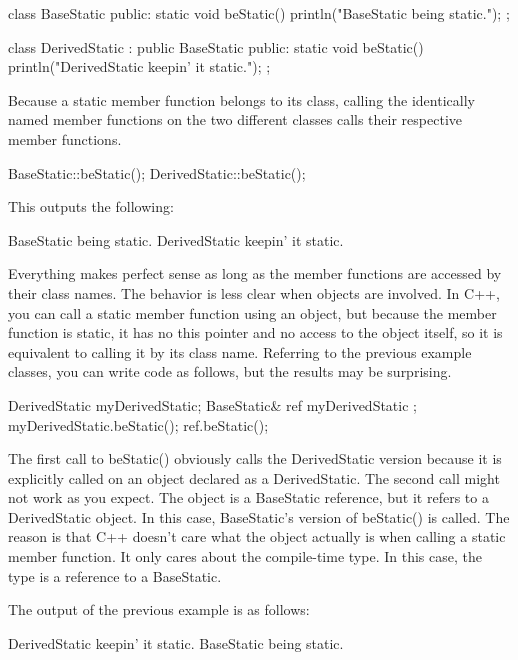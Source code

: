 \begin{cpp}
class BaseStatic
{
    public:
    static void beStatic() { println("BaseStatic being static."); }
};

class DerivedStatic : public BaseStatic
{
    public:
    static void beStatic() { println("DerivedStatic keepin' it static."); }
};
\end{cpp}

Because a static member function belongs to its class, calling the identically named member functions on the two different classes calls their respective member functions.

\begin{cpp}
BaseStatic::beStatic();
DerivedStatic::beStatic();
\end{cpp}

This outputs the following:

\begin{shell}
BaseStatic being static.
DerivedStatic keepin' it static.
\end{shell}

Everything makes perfect sense as long as the member functions are accessed by their class names. The behavior is less clear when objects are involved. In C++, you can call a static member function using an object, but because the member function is static, it has no this pointer and no access to the object itself, so it is equivalent to calling it by its class name. Referring to the previous example classes, you can write code as follows, but the results may be surprising.

\begin{cpp}
DerivedStatic myDerivedStatic;
BaseStatic& ref { myDerivedStatic };
myDerivedStatic.beStatic();
ref.beStatic();
\end{cpp}

The first call to beStatic() obviously calls the DerivedStatic version because it is explicitly called on an object declared as a DerivedStatic. The second call might not work as you expect. The object is a BaseStatic reference, but it refers to a DerivedStatic object. In this case, BaseStatic’s version of beStatic() is called. The reason is that C++ doesn’t care what the object actually is when calling a static member function. It only cares about the compile-time type. In this case, the type is a reference to a BaseStatic.

The output of the previous example is as follows:

\begin{shell}
DerivedStatic keepin' it static.
BaseStatic being static.
\end{shell}

